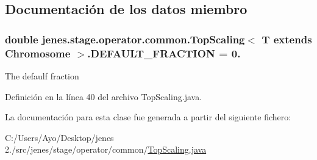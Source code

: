 \subsection{Documentación de los datos miembro}
\hypertarget{classjenes_1_1stage_1_1operator_1_1common_1_1_top_scaling_3_01_t_01extends_01_chromosome_01_4_af21f9346a23ebaab4d7a5bd4367edafe}{
\subsubsection[{D\-E\-F\-A\-U\-L\-T\-\_\-\-F\-R\-A\-C\-T\-I\-O\-N}]{\setlength{\rightskip}{0pt plus 5cm}double jenes.\-stage.\-operator.\-common.\-Top\-Scaling$<$ T extends Chromosome $>$.D\-E\-F\-A\-U\-L\-T\-\_\-\-F\-R\-A\-C\-T\-I\-O\-N = 0.\hspace{0.3cm}{\ttfamily [static]}}}\label{classjenes_1_1stage_1_1operator_1_1common_1_1_top_scaling_3_01_t_01extends_01_chromosome_01_4_af21f9346a23ebaab4d7a5bd4367edafe}
The defaulf fraction 

Definición en la línea 40 del archivo Top\-Scaling.\-java.



La documentación para esta clase fue generada a partir del siguiente fichero\-:\begin{DoxyCompactItemize}
\item 
C\-:/\-Users/\-Ayo/\-Desktop/jenes 2./src/jenes/stage/operator/common/\hyperlink{_top_scaling_8java}{Top\-Scaling.\-java}\end{DoxyCompactItemize}
